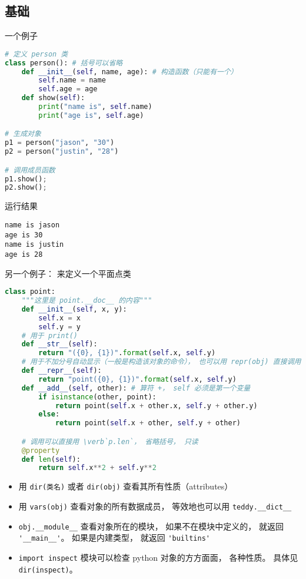
\begin{issues}
\issueDraft
\end{issues}


\subsection{基础}
一个例子
\begin{lstlisting}[language=python]
# 定义 person 类
class person(): # 括号可以省略
    def __init__(self, name, age): # 构造函数（只能有一个）
        self.name = name 
        self.age = age 
    def show(self): 
        print("name is", self.name)
        print("age is", self.age)

# 生成对象
p1 = person("jason", "30") 
p2 = person("justin", "28")

# 调用成员函数
p1.show();
p2.show();
\end{lstlisting}
运行结果
\begin{lstlisting}[language=none]
name is jason
age is 30
name is justin
age is 28
\end{lstlisting}

另一个例子： 来定义一个平面点类
\begin{lstlisting}[language=python]
class point:
    """这里是 point.__doc__ 的内容"""
    def __init__(self, x, y): 
        self.x = x
        self.y = y
    # 用于 print()
    def __str__(self):
        return "({0}, {1})".format(self.x, self.y)
    # 用于不加分号自动显示（一般是构造该对象的命令）， 也可以用 repr(obj) 直接调用
    def __repr__(self):
        return "point({0}, {1})".format(self.x, self.y)
    def __add__(self, other): # 算符 +， self 必须是第一个变量
        if isinstance(other, point):
            return point(self.x + other.x, self.y + other.y)
        else:
            return point(self.x + other, self.y + other)

    # 调用可以直接用 \verb`p.len`， 省略括号， 只读
    @property
    def len(self):
        return self.x**2 + self.y**2
\end{lstlisting}

\begin{itemize}
\item 用 \verb`dir(类名)` 或者 \verb`dir(obj)` 查看其所有性质（attributes）
\item 用 \verb`vars(obj)` 查看对象的所有数据成员， 等效地也可以用 \verb`teddy.__dict__`
\item \verb`obj.__module__` 查看对象所在的模块， 如果不在模块中定义的， 就返回 \verb`'__main__'`。 如果是内建类型， 就返回 \verb`'builtins'`
\item \verb`import inspect` 模块可以检查 python 对象的方方面面， 各种性质。 具体见 \verb`dir(inspect)`。
\end{itemize}

